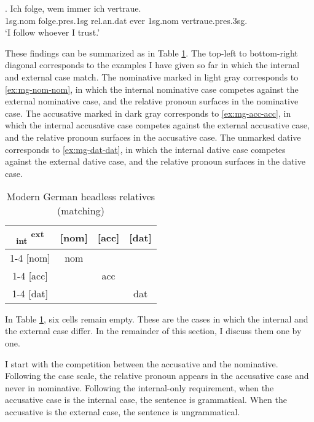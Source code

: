 \exg. Ich folge, wem immer ich vertraue.\\
 1\ac{sg}.\ac{nom} folge.\ac{pres}.1\ac{sg}\scsub{[dat]} \ac{rel}.\ac{an}.\ac{dat} ever 1\ac{sg}.\ac{nom} vertraue.\ac{pres}.3\ac{sg}\scsub{[dat]}.\\
 `I follow whoever I trust.' \label{ex:mg-dat-dat}

These findings can be summarized as in Table \ref{tbl:summary-mg-matching}. The top-left to bottom-right diagonal corresponds to the examples I have given so far in which the internal and external case match. The nominative marked in light gray corresponds to \ref{ex:mg-nom-nom}, in which the internal nominative case competes against the external nominative case, and the relative pronoun surfaces in the nominative case. The accusative marked in dark gray corresponds to \ref{ex:mg-acc-acc}, in which the internal accusative case competes against the external accusative case, and the relative pronoun surfaces in the accusative case. The unmarked dative corresponds to \ref{ex:mg-dat-dat}, in which the internal dative case competes against the external dative case, and the relative pronoun surfaces in the dative case.

\begin{table}[H]
 \center
 \caption{Modern German headless relatives (matching)}
 \begin{tabular}{c|c|c|c}
   \toprule
    \textsubscript{\ac{int}} \textsuperscript{\ac{ext}}
         & [\ac{nom}]
         & [\ac{acc}]
         & [\ac{dat}]
         \\ \cmidrule{1-4}
     [\ac{nom}]
         & \colorbox{LG}{\ac{nom}}
         &
         &
         \\ \cmidrule{1-4}
     [\ac{acc}]
         &
         & \colorbox{DG}{\ac{acc}}
         &
         \\ \cmidrule{1-4}
     [\ac{dat}]
         &
         &
         & \ac{dat}
         \\
   \bottomrule
 \end{tabular}
   \label{tbl:summary-mg-matching}
\end{table}

In Table \ref{tbl:summary-mg-matching}, six cells remain empty. These are the cases in which the internal and the external case differ. In the remainder of this section, I discuss them one by one.

I start with the competition between the accusative and the nominative. Following the case scale, the relative pronoun appears in the accusative case and never in nominative. Following the internal-only requirement, when the accusative case is the internal case, the sentence is grammatical. When the accusative is the external case, the sentence is ungrammatical.

